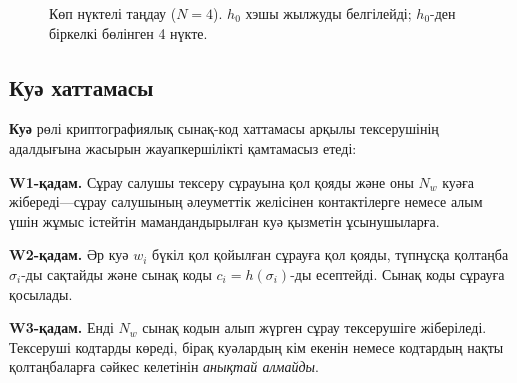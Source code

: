 \documentclass[11pt,a4paper,twocolumn]{article}
\begin{document}
\begin{figure}[ht]
\centering
{}
\caption{Көп нүктелі таңдау ($N{=}4$). $h_0$ хэшы жылжуды белгілейді; $h_0$-ден біркелкі бөлінген 4 нүкте.}
\label{fig:multipoint}
\end{figure}

\subsection{Куә хаттамасы}

\textbf{Куә} рөлі криптографиялық сынақ-код хаттамасы арқылы тексерушінің адалдығына жасырын жауапкершілікті қамтамасыз етеді:

\textbf{W1-қадам.} Сұрау салушы тексеру сұрауына қол қояды және оны $N_w$ куәға жібереді---сұрау салушының әлеуметтік желісінен контактілерге немесе алым үшін жұмыс істейтін мамандандырылған куә қызметін ұсынушыларға.

\textbf{W2-қадам.} Әр куә $w_i$ бүкіл қол қойылған сұрауға қол қояды, түпнұсқа қолтаңба $\sigma_i$-ды сақтайды және сынақ коды $c_i = h(\sigma_i)$-ды есептейді. Сынақ коды сұрауға қосылады.

\textbf{W3-қадам.} Енді $N_w$ сынақ кодын алып жүрген сұрау тексерушіге жіберіледі. Тексеруші кодтарды көреді, бірақ куәлардың кім екенін немесе кодтардың нақты қолтаңбаларға сәйкес келетінін \emph{анықтай алмайды}.
\end{document}
